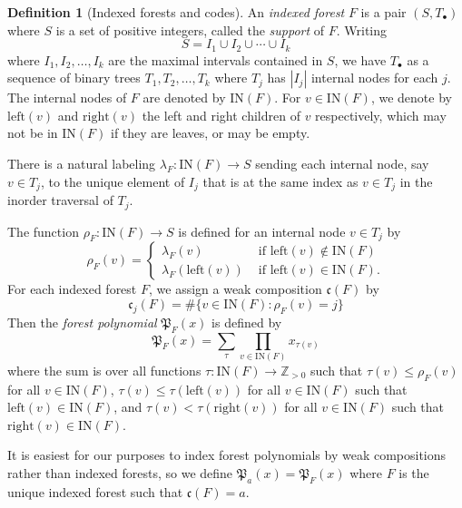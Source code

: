 \documentclass[a4paper,fleqn]{cas-sc}
\theoremstyle{definition}
\newtheorem{definition}[lemma]{Definition}
\theoremstyle{remark}
\numberwithin{equation}{subsection}
\newcommand{\code}{\mathfrak{c}}
\newcommand{\forest}{\mathfrak{P}}
\begin{document}
\begin{definition}[Indexed forests and codes]
  An \emph{indexed forest} $F$ is a pair $(S, T_\bullet)$ where $S$ is a set of positive integers, called the \emph{support} of $F$. Writing
  $$S=I_1\cup I_2\cup \cdots \cup I_k$$
  where $I_1,I_2,\ldots, I_k$ are the maximal intervals contained in $S$, we have $T_\bullet$ as a sequence of binary trees $T_1,T_2,\ldots, T_k$ where $T_j$ has $|I_j|$ internal nodes for each $j$. The internal nodes of $F$ are denoted by $\mathrm{IN}(F)$. For $v\in \mathrm{IN}(F)$, we denote by $\mathrm{left}(v)$ and $\mathrm{right}(v)$ the left and right children of $v$ respectively, which may not be in $\mathrm{IN}(F)$ if they are leaves, or may be empty.
  
  There is a natural labeling $\lambda_F:\mathrm{IN}(F)\to S$ sending each internal node, say $v\in T_j$, to the unique element of $I_j$ that is at the same index as $v\in T_j$ in the inorder traversal of $T_j$.
  
  The function $\rho_F:\mathrm{IN}(F)\to S$ is defined for an internal node $v\in T_j$ by 
  $$\rho_F(v) = \begin{cases}
  \lambda_F(v)&\mbox{ if }\mathrm{left}(v)\notin\mathrm{IN}(F)\\
  \lambda_F(\mathrm{left}(v))&\mbox{ if }\mathrm{left}(v)\in\mathrm{IN}(F).
  \end{cases}$$
  For each indexed forest $F$, we assign a weak composition $\code(F)$ by
  $$\code_j(F)=\#\{v\in \mathrm{IN}(F): \rho_F(v)=j\}$$
  Then the \emph{forest polynomial} $\forest_F(x)$ is defined by
  $$\forest_F(x) = \sum_{\tau}\prod_{v\in\mathrm{IN}(F)}x_{\tau(v)}$$
  where the sum is over all functions $\tau:\mathrm{IN}(F)\to \mathbb{Z}_{>0}$ such that $\tau(v)\leq \rho_F(v)$ for all $v\in \mathrm{IN}(F)$, $\tau(v)\leq\tau(\mathrm{left}(v))$ for all $v\in \mathrm{IN}(F)$ such that $\mathrm{left}(v)\in \mathrm{IN}(F)$, and $\tau(v)<\tau(\mathrm{right}(v))$ for all $v\in \mathrm{IN}(F)$ such that $\mathrm{right}(v)\in \mathrm{IN}(F)$.

  It is easiest for our purposes to index forest polynomials by weak compositions rather than indexed forests, so we define $\forest_a(x) = \forest_F(x)$ where $F$ is the unique indexed forest such that $\code(F) = a$.
\end{definition}
\end{document}

